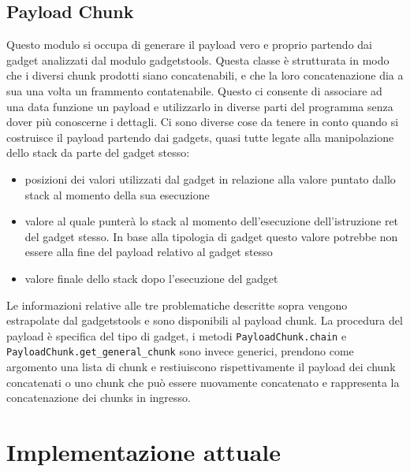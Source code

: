 \subsection{Payload Chunk}

Questo modulo si occupa di generare il payload vero e proprio partendo
dai gadget analizzati dal modulo gadgetstools. Questa classe è
strutturata in modo che i diversi chunk prodotti siano concatenabili,
e che la loro concatenazione dia a sua una volta un frammento
contatenabile. Questo ci consente di associare ad una data funzione un
payload e utilizzarlo in diverse parti del programma senza dover più
conoscerne i dettagli. Ci sono diverse cose da tenere in conto quando
si costruisce il payload partendo dai gadgets, quasi tutte legate alla
manipolazione dello stack da parte del gadget stesso:

\begin{itemize}

  \item posizioni dei valori utilizzati dal gadget in relazione alla
    valore puntato dallo stack al momento della sua esecuzione

  \item valore al quale punterà lo stack al momento dell'esecuzione
    dell'istruzione ret del gadget stesso. In base alla tipologia di
    gadget questo valore potrebbe non essere alla fine del payload
    relativo al gadget stesso
    
  \item valore finale dello stack dopo l'esecuzione del gadget

\end{itemize}

Le informazioni relative alle tre problematiche descritte sopra
vengono estrapolate dal gadgetstools e sono disponibili al payload
chunk. La procedura del payload è specifica del tipo di gadget, i
metodi \lstinline{PayloadChunk.chain} e
\lstinline{PayloadChunk.get_general_chunk} sono invece generici,
prendono come argomento una lista di chunk e restiuiscono
rispettivamente il payload dei chunk concatenati o uno chunk che può
essere nuovamente concatenato e rappresenta la concatenazione dei
chunks in ingresso.


\section{Implementazione attuale}

